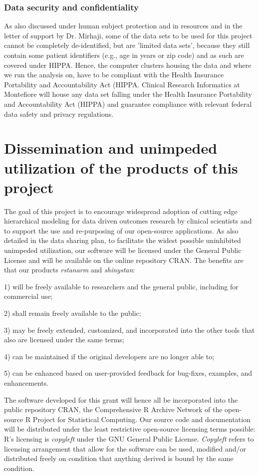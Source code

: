 \documentclass[11pt,notitlepage]{article}
\begin{document}
\subsubsection*{Data security and confidentiality}
As also discussed under human subject protection and in resources and in the letter of support by Dr. Mirhaji, some of the data sets to 
be used for this project cannot be completely de-identified, but are 'limited data sets', because they still contain some patient 
identifiers (e.g., age in years or zip code) and as such are covered under HIPPA. Hence, the computer clusters housing the data and where 
we run the analysis on, have to be compliant with the Health Insurance Portability and Accountability Act (HIPPA. Clinical Research 
Informatics at Montefiore will house any data set falling under the Health Insurance Portability and Accountability Act (HIPPA) and 
guarantee compliance with relevant federal data safety and privacy regulations. 

\section*{Dissemination and unimpeded utilization of the products of this project}
The goal of this project is to encourage widespread adoption of cutting edge 
hierarchical modeling for data driven outcomes research by clinical scientists and to support the use and re-purposing of our 
open-source applications. As also detailed in the data sharing plan, to facilitate the widest 
possible uninhibited unimpeded utilization, our software will be 
licensed under the General Public License and will be available on 
the online repository CRAN. The benefits  are that our products 
\textit{rstanarm} and \textit{shinystan}: 
 
1) will be freely available to researchers and the general public, including for commercial use; 

2) shall remain freely available to the public;

3) may be freely extended, customized, and incorporated into the other tools that also are licensed under the same terms; 

4) can be maintained if the original developers are no longer able to; 

5) can be enhanced based on user-provided feedback for bug-fixes, examples, and enhancements.

The software developed for this grant will hence all be incorporated into the public repository CRAN, 
the Comprehensive R Archive Network of the open-source R Project for Statistical Computing. Our source code and documentation 
will be distributed under the least restrictive open-source licensing terms possible: R's licensing is \textit{copyleft} under the 
GNU General Public License. \textit{Copyleft} refers to licensing arrangement that allow for the software can be used, modified and/or 
distributed freely on condition that anything derived is bound by the same condition. 
\end{document}
